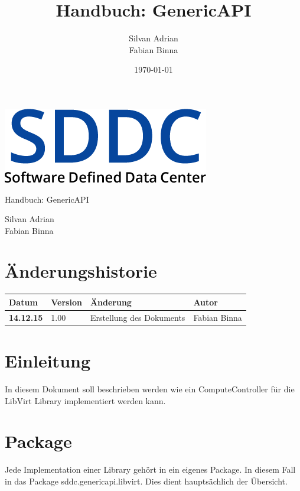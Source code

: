 \documentclass[11pt]{scrartcl}
\title{Handbuch: GenericAPI}
\author{Silvan Adrian \\ Fabian Binna}
\date{\today{}}
\begin{document}
\def\arraystretch{1.5}
\begin{titlepage}
\begin{center}
\vspace{10em}
\includegraphics[scale=2]{SDDC}
\vspace{10em}
\end{center}
\begin{center}
\huge {Handbuch: GenericAPI}
\end{center}
\begin{center}
\vspace{10em}
\LARGE {Silvan Adrian} \\
\LARGE {Fabian Binna}
\end{center}

\end{titlepage}

\newpage
\section{Änderungshistorie}
\begin{tabularx}{\linewidth}{l l X l}
\textbf{Datum} & \textbf{Version} & \textbf{Änderung}  & \textbf{Autor} \\
\hline
\textbf{14.12.15} & 1.00 & Erstellung des Dokuments & Fabian Binna \\

\end{tabularx}

\newpage
\tableofcontents
\newpage

\section{Einleitung}
In diesem Dokument soll beschrieben werden wie ein ComputeController für die LibVirt Library implementiert werden kann. 

\section{Package}
Jede Implementation einer Library gehört in ein eigenes Package. In diesem Fall in das Package sddc.genericapi.libvirt. Dies dient hauptsächlich der Übersicht.
\end{document}
